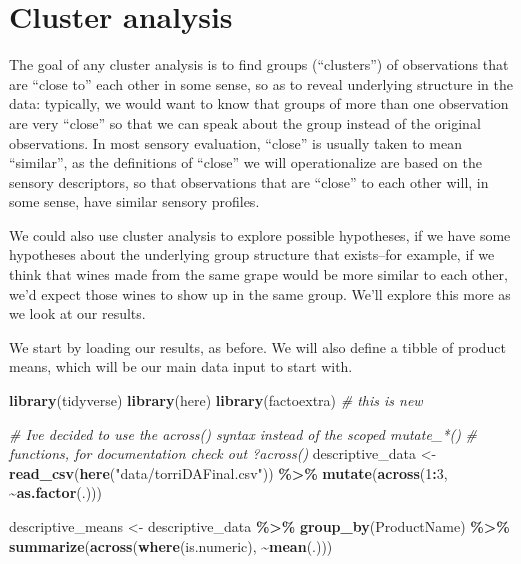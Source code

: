 \documentclass[
]{book}
\newenvironment{Shaded}{\begin{snugshade}}{\end{snugshade}}
\newcommand{\CommentTok}[1]{\textcolor[rgb]{0.56,0.35,0.01}{\textit{#1}}}
\newcommand{\DecValTok}[1]{\textcolor[rgb]{0.00,0.00,0.81}{#1}}
\newcommand{\FunctionTok}[1]{\textcolor[rgb]{0.13,0.29,0.53}{\textbf{#1}}}
\newcommand{\NormalTok}[1]{#1}
\newcommand{\OtherTok}[1]{\textcolor[rgb]{0.56,0.35,0.01}{#1}}
\newcommand{\SpecialCharTok}[1]{\textcolor[rgb]{0.81,0.36,0.00}{\textbf{#1}}}
\newcommand{\StringTok}[1]{\textcolor[rgb]{0.31,0.60,0.02}{#1}}
\begin{document}
\chapter{Cluster analysis}\label{cluster-analysis}

The goal of any cluster analysis is to find groups (``clusters'') of observations that are ``close to'' each other in some sense, so as to reveal underlying structure in the data: typically, we would want to know that groups of more than one observation are very ``close'' so that we can speak about the group instead of the original observations. In most sensory evaluation, ``close'' is usually taken to mean ``similar'', as the definitions of ``close'' we will operationalize are based on the sensory descriptors, so that observations that are ``close'' to each other will, in some sense, have similar sensory profiles.

We could also use cluster analysis to explore possible hypotheses, if we have some hypotheses about the underlying group structure that exists--for example, if we think that wines made from the same grape would be more similar to each other, we'd expect those wines to show up in the same group. We'll explore this more as we look at our results.

We start by loading our results, as before. We will also define a tibble of product means, which will be our main data input to start with.

\begin{Shaded}
\begin{Highlighting}[]
\FunctionTok{library}\NormalTok{(tidyverse)}
\FunctionTok{library}\NormalTok{(here)}
\FunctionTok{library}\NormalTok{(factoextra) }\CommentTok{\# this is new}

\CommentTok{\# I\textquotesingle{}ve decided to use the \textasciigrave{}across()\textasciigrave{} syntax instead of the scoped mutate\_*()}
\CommentTok{\# functions, for documentation check out ?across()}
\NormalTok{descriptive\_data }\OtherTok{\textless{}{-}} \FunctionTok{read\_csv}\NormalTok{(}\FunctionTok{here}\NormalTok{(}\StringTok{"data/torriDAFinal.csv"}\NormalTok{)) }\SpecialCharTok{\%\textgreater{}\%}
  \FunctionTok{mutate}\NormalTok{(}\FunctionTok{across}\NormalTok{(}\DecValTok{1}\SpecialCharTok{:}\DecValTok{3}\NormalTok{, }\SpecialCharTok{\textasciitilde{}}\FunctionTok{as.factor}\NormalTok{(.)))}

\NormalTok{descriptive\_means }\OtherTok{\textless{}{-}} 
\NormalTok{  descriptive\_data }\SpecialCharTok{\%\textgreater{}\%}
  \FunctionTok{group\_by}\NormalTok{(ProductName) }\SpecialCharTok{\%\textgreater{}\%}
  \FunctionTok{summarize}\NormalTok{(}\FunctionTok{across}\NormalTok{(}\FunctionTok{where}\NormalTok{(is.numeric), }\SpecialCharTok{\textasciitilde{}}\FunctionTok{mean}\NormalTok{(.)))}
\end{Highlighting}
\end{Shaded}
\end{document}

